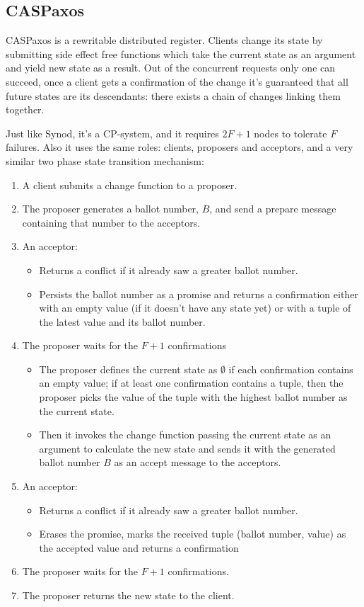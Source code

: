 \documentclass[12pt]{article}
\theoremstyle{definition}
\begin{document}
\subsection{CASPaxos}

CASPaxos is a rewritable distributed register. Clients change its state by submitting side effect free functions which take the current state as an argument and yield new state as a result. Out of the concurrent requests only one can succeed, once a client gets a confirmation of the change it's guaranteed that all future states are its descendants: there exists a chain of changes linking them together.

Just like Synod, it's a CP-system, and it requires $2F+1$ nodes to tolerate $F$ failures. Also it uses the same roles: clients, proposers and acceptors, and a very similar two phase state transition mechanism:
\begin{enumerate}
  \item A client submits a change function to a proposer.
  \item The proposer generates a ballot number, $B$, and send a prepare message containing that number to the acceptors.
  \item An acceptor:
  \begin{itemize}
    \item Returns a conflict if it already saw a greater ballot number.
    \item Persists the ballot number as a promise and returns a confirmation either with an empty value (if it doesn't have any state yet) or with a tuple of the latest value and its ballot number.
  \end{itemize}
  \item The proposer waits for the $F+1$ confirmations
  \begin{itemize}
    \item The proposer defines the current state as $\emptyset$ if each confirmation contains an empty value; if at least one confirmation contains a tuple, then the proposer picks the value of the tuple with the highest ballot number as the current state.
    \item Then it invokes the change function passing the current state as an argument to calculate the new state and sends it with the generated ballot number $B$ as an accept message to the acceptors.
  \end{itemize}
  \item An acceptor:
  \begin{itemize}
    \item Returns a conflict if it already saw a greater ballot number.
    \item Erases the promise, marks the received tuple (ballot number, value) as the accepted value and returns a confirmation
  \end{itemize}
  \item The proposer waits for the $F+1$ confirmations.
  \item The proposer returns the new state to the client.
\end{enumerate}
\end{document}
